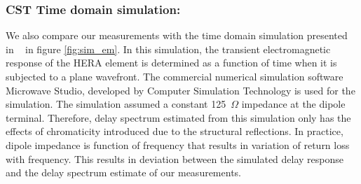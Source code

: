 \documentclass[twocolumn]{emulateapj}
\begin{document}
    
   \subsubsection{CST Time domain simulation:}  
    We also compare our measurements with the time domain simulation presented in ~\cite{Ewall-Wice_et_al2016} in figure \ref{fig:sim_em}. In this simulation, the transient electromagnetic response of the HERA element is determined as a function of time when it is subjected to a plane wavefront. The commercial numerical simulation software Microwave Studio, developed by Computer Simulation Technology is used for the simulation. The simulation assumed a constant 125~$\Omega$ impedance at the dipole terminal. Therefore, delay spectrum estimated from this simulation only has the effects of chromaticity introduced due to the structural reflections. In practice, dipole impedance is function of frequency that results in variation of return loss with frequency. This results in deviation between the simulated delay response and the delay spectrum estimate of our measurements. \\
\end{document}

